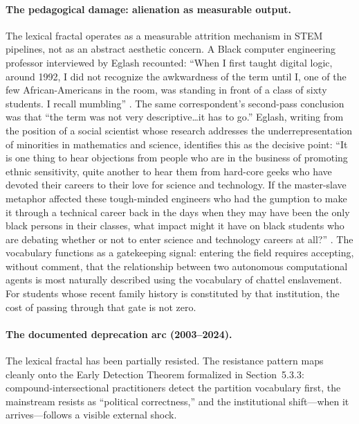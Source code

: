 \paragraph{The pedagogical damage: alienation as measurable output.}
The lexical fractal operates as a measurable attrition mechanism in STEM pipelines, not as an abstract aesthetic concern. A Black computer engineering professor interviewed by Eglash recounted: ``When I first taught digital logic, around 1992, I did not recognize the awkwardness of the term until I, one of the few African-Americans in the room, was standing in front of a class of sixty students. I recall mumbling'' \cite{eglash_broken}. The same correspondent's second-pass conclusion was that ``the term was not very descriptive\ldots it has to go.'' Eglash, writing from the position of a social scientist whose research addresses the underrepresentation of minorities in mathematics and science, identifies this as the decisive point: ``It is one thing to hear objections from people who are in the business of promoting ethnic sensitivity, quite another to hear them from hard-core geeks who have devoted their careers to their love for science and technology. If the master-slave metaphor affected these tough-minded engineers who had the gumption to make it through a technical career back in the days when they may have been the only black persons in their classes, what impact might it have on black students who are debating whether or not to enter science and technology careers at all?'' \cite{eglash_broken}. The vocabulary functions as a gatekeeping signal: entering the field requires accepting, without comment, that the relationship between two autonomous computational agents is most naturally described using the vocabulary of chattel enslavement. For students whose recent family history is constituted by that institution, the cost of passing through that gate is not zero.

\paragraph{The documented deprecation arc (2003--2024).}
The lexical fractal has been partially resisted. The resistance pattern maps cleanly onto the Early Detection Theorem formalized in Section~5.3.3: compound-intersectional practitioners detect the partition vocabulary first, the mainstream resists as ``political correctness,'' and the institutional shift---when it arrives---follows a visible external shock.

